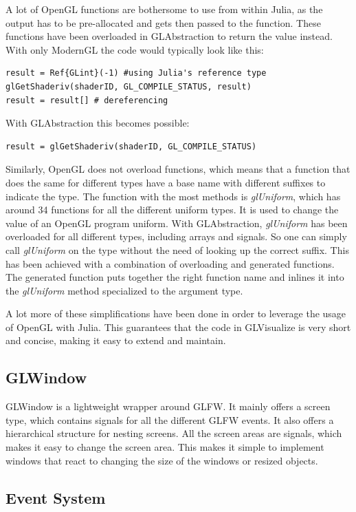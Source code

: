 A lot of OpenGL functions are bothersome to use from within Julia, as the output has to be pre-allocated and gets then passed to the function.
These functions have been overloaded in GLAbstraction to return the value instead.
With only ModernGL the code would typically look like this:
\begin{lstlisting}
result = Ref{GLint}(-1) #using Julia's reference type
glGetShaderiv(shaderID, GL_COMPILE_STATUS, result)
result = result[] # dereferencing
\end{lstlisting}
With GLAbstraction this becomes possible:
\begin{lstlisting}
result = glGetShaderiv(shaderID, GL_COMPILE_STATUS)
\end{lstlisting}

Similarly, OpenGL does not overload functions, which means that a function that does the same for different types have a base name with different suffixes to indicate the type.
The function with the most methods is \textit{glUniform}, which has around 34 functions for all the different uniform types. It is used to change the value of an \ac{OpenGL} program uniform.
With GLAbstraction, \textit{glUniform} has been overloaded for all different types, including arrays and signals. So one can simply call \textit{glUniform} on the type without the need of looking up the correct suffix.
This has been achieved with a combination of overloading and generated functions.
The generated function puts together the right function name and inlines it into the \textit{glUniform} method specialized to the argument type.

A lot more of these simplifications have been done in order to leverage the usage of OpenGL with Julia.
This guarantees that the code in GLVisualize is very short and concise, making it easy to extend and maintain.

\subsection{GLWindow}
GLWindow is a lightweight wrapper around GLFW.
It mainly offers a screen type, which contains signals for all the different GLFW events. 
It also offers a hierarchical structure for nesting screens.
All the screen areas are signals, which makes it easy to change the screen area. 
This makes it simple to implement windows that react to changing the size of the windows or resized objects.


\subsection{Event System}

